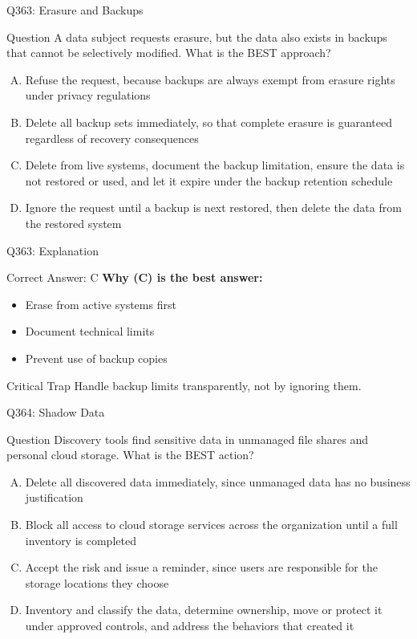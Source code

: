 \documentclass{beamer}
\begin{document}
	\begin{frame}{Q363: Erasure and Backups}
		\begin{block}{Question}
			\small A data subject requests erasure, but the data also exists in backups that cannot be selectively modified. What is the BEST approach?
		\end{block}
		\begin{enumerate}[(A)]
			\footnotesize
			\item Refuse the request, because backups are always exempt from erasure rights under privacy regulations
			\item Delete all backup sets immediately, so that complete erasure is guaranteed regardless of recovery consequences
			\item Delete from live systems, document the backup limitation, ensure the data is not restored or used, and let it expire under the backup retention schedule
			\item Ignore the request until a backup is next restored, then delete the data from the restored system
		\end{enumerate}
	\end{frame}
	
	\begin{frame}{Q363: Explanation}
		\begin{block}{Correct Answer: C}
			\textbf{Why (C) is the best answer:}
			\begin{itemize}
				\item Erase from active systems first
				\item Document technical limits
				\item Prevent use of backup copies
			\end{itemize}
		\end{block}
		\begin{alertblock}{Critical Trap}
			Handle backup limits transparently, not by ignoring them.
		\end{alertblock}
	\end{frame}
	
	\begin{frame}{Q364: Shadow Data}
		\begin{block}{Question}
			\small Discovery tools find sensitive data in unmanaged file shares and personal cloud storage. What is the BEST action?
		\end{block}
		\begin{enumerate}[(A)]
			\footnotesize
			\item Delete all discovered data immediately, since unmanaged data has no business justification
			\item Block all access to cloud storage services across the organization until a full inventory is completed
			\item Accept the risk and issue a reminder, since users are responsible for the storage locations they choose
			\item Inventory and classify the data, determine ownership, move or protect it under approved controls, and address the behaviors that created it
		\end{enumerate}
	\end{frame}
	
\end{document}
